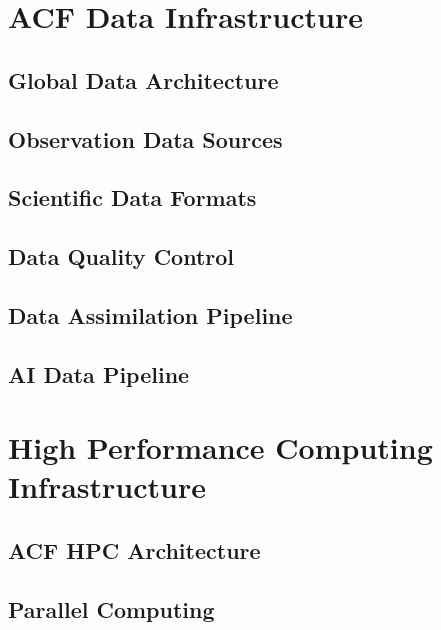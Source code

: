 \documentclass[11pt,a4paper,oneside]{report}
\begin{document}
\part{ACF Data Infrastructure}


\chapter{Global Data Architecture}



\chapter{Observation Data Sources}



\chapter{Scientific Data Formats}



\chapter{Data Quality Control}



\chapter{Data Assimilation Pipeline}



\chapter{AI Data Pipeline}



\part{High Performance Computing Infrastructure}


\chapter{ACF HPC Architecture}



\chapter{Parallel Computing}

\end{document}
